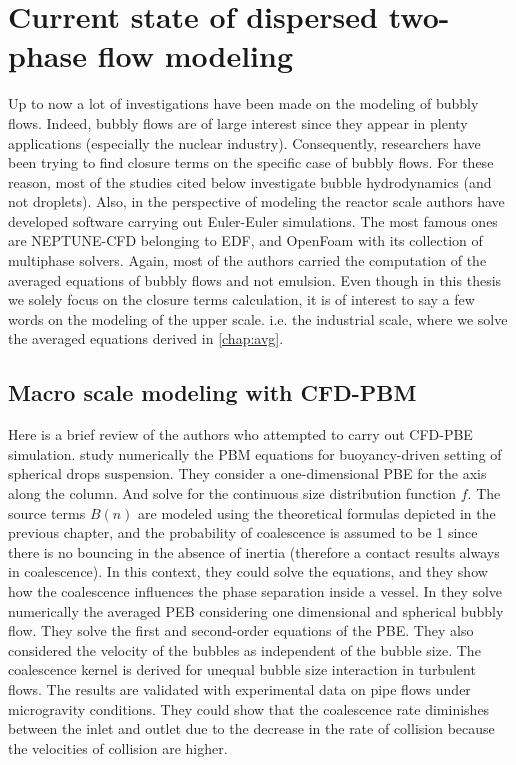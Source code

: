 \section{Current state of dispersed two-phase flow  modeling}

Up to now a lot of investigations have been made on the modeling of bubbly flows.
Indeed, bubbly flows are of large interest since they appear in plenty applications (especially the nuclear industry).
Consequently, researchers have been trying to find closure terms on the specific case of bubbly flows. 
For these reason, most of the studies cited below investigate bubble hydrodynamics (and not droplets). 
Also, in the perspective of modeling the reactor scale authors have developed software carrying out Euler-Euler simulations. 
The most famous ones are NEPTUNE-CFD belonging to EDF, and OpenFoam with its collection of multiphase solvers. 
Again, most of the authors carried the computation of the averaged equations of bubbly flows and not emulsion.
Even though in this thesis we solely focus on the closure terms calculation, it is of interest to say a few words on the modeling of the upper scale.
i.e. the industrial scale, where we solve the averaged equations derived in \ref{chap:avg}. 

\subsection{Macro scale modeling with CFD-PBM}
Here is a brief review of the authors who attempted to carry out CFD-PBE simulation.
\citet{wang1995simultaneous} study numerically the PBM equations for buoyancy-driven setting of spherical drops suspension.
They consider a one-dimensional PBE for the axis along the column. 
And solve for the continuous size distribution function $f$.
The source terms $B(n)$ are modeled using the theoretical formulas depicted in the previous chapter, and the probability of coalescence is assumed to be 1 since there is no bouncing in the absence of inertia (therefore a contact results always in coalescence). 
In this context, they could solve the equations, and they show how the coalescence influences the phase separation inside a vessel.
In \cite{KAMP20011363} they solve numerically the averaged PEB considering one dimensional and spherical bubbly flow.
They solve the first and second-order equations of the PBE.
They also considered the velocity of the bubbles as independent of the bubble size. 
The coalescence kernel is derived for unequal bubble size interaction in turbulent flows. 
The results are validated with experimental data on pipe flows under microgravity conditions. 
They could show that the coalescence rate diminishes between the inlet and outlet due to the decrease in the rate of collision because the velocities of collision are higher. 

